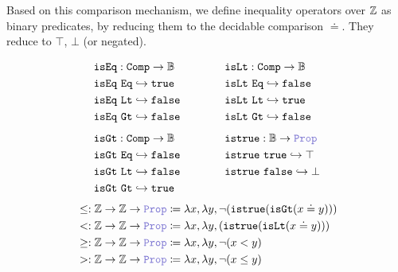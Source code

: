 \begin{definition}
Based on this comparison mechanism, we define inequality operators over $\mathbb{Z}$ as binary predicates, by reducing them to the decidable comparison $\doteq$. They reduce to $\top$, $\bot$ (or negated).

\[
\begin{array}{l@{\hspace{4em}}l}
\begin{aligned}
  &\tt{isEq} : \tt{Comp} \ra \B \\
  &\tt{isEq}~\tt{Eq} \re \tt{true} \\
  &\tt{isEq}~\tt{Lt} \re \tt{false} \\
  &\tt{isEq}~\tt{Gt} \re \tt{false}
\end{aligned}
&
\begin{aligned}
  &\tt{isLt} : \tt{Comp} \ra \B \\
  &\tt{isLt}~\tt{Eq} \re \tt{false} \\
  &\tt{isLt}~\tt{Lt} \re \tt{true} \\
  &\tt{isLt}~\tt{Gt} \re \tt{false}
\end{aligned}
\\[3em]
\begin{aligned}
  &\tt{isGt} : \tt{Comp} \ra \B \\
  &\tt{isGt}~\tt{Eq} \re \tt{false} \\
  &\tt{isGt}~\tt{Lt} \re \tt{false} \\
  &\tt{isGt}~\tt{Gt} \re \tt{true}
\end{aligned}
&
\begin{aligned}
  &\tt{istrue} : \B \ra \prop \\
  &\tt{istrue}~\tt{true} \re \top \\
  &\tt{istrue}~\tt{false} \re \bot\\
  &\\
\end{aligned}
\end{array}
\]
\noindent
\begin{align*}
&\leq: \Z \ra \Z \ra \prop  \coloneq \lambda x,\lambda y, \neg (\tt{istrue}(\tt{isGt}(x \doteq y))) \\
&<: \Z \ra \Z \ra \prop  \coloneq \lambda x,\lambda y, (\tt{istrue}(\tt{isLt}(x \doteq y))) \\
&\geq: \Z \ra \Z \ra \prop \coloneq \lambda x,\lambda y, \neg (x < y) \\
&>: \Z \ra \Z \ra \prop  \coloneq \lambda x,\lambda y, \neg (x \leq y)
\end{align*}
\end{definition}

